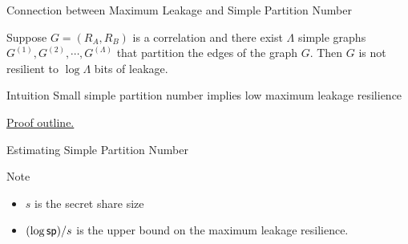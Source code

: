 \begin{frame}{Connection between Maximum Leakage and Simple Partition Number}
	\begin{lemma}
		Suppose $ G = (R_A, R_B) $ is a correlation and there exist $\Lambda$ simple graphs $ G^{(1)}, G^{(2)}, \cdots, G^{(\Lambda)} $ that partition the edges of the graph $ G $. 
		Then $ G $ is not resilient to $ \log \Lambda $ bits of leakage.
	\end{lemma}
	\pause
	
	\begin{block}{Intuition}
		Small simple partition number implies low maximum leakage resilience
	\end{block}
	\pause
	\underline{Proof outline.} 

\end{frame}

\begin{frame}{Estimating Simple Partition Number}
	
	{
		\begin{block}{Note}
			\begin{itemize}
				\item $ s $ is the secret share size
				\item $ (\log \mathsf{sp})/s $ is the upper bound on the maximum leakage resilience.
			\end{itemize}
		\end{block}
	}
\end{frame}

